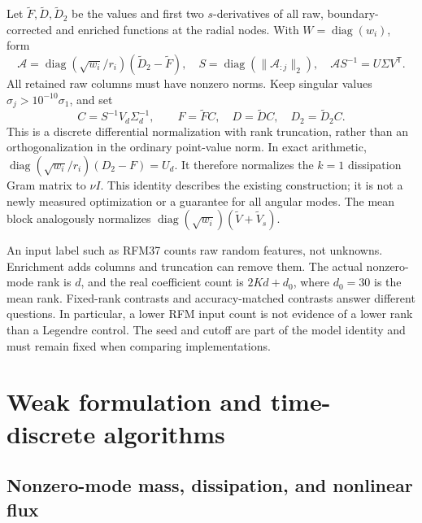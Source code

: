 Let \(\widetilde F,\widetilde D,\widetilde D_2\) be the values and
first two \(s\)-derivatives of all raw, boundary-corrected and enriched
functions at the radial nodes. With \(W=\operatorname{diag}(w_i)\),
form
\begin{equation}
 \mathcal A=\operatorname{diag}(\sqrt{w_i}/r_i)
              (\widetilde D_2-\widetilde F),\quad
 S=\operatorname{diag}(\|\mathcal A_{:j}\|_2),\quad
 \mathcal A S^{-1}=U\Sigma V^{\mathsf T}.
 \label{eq:feature-svd}
\end{equation}
All retained raw columns must have nonzero norms. Keep singular values
\(\sigma_j>10^{-10}\sigma_1\), and set
\begin{equation}
 C=S^{-1}V_d\Sigma_d^{-1},\qquad
 F=\widetilde F C,\quad D=\widetilde D C,\quad
 D_2=\widetilde D_2 C.
 \label{eq:feature-transform}
\end{equation}
This is a discrete differential normalization with rank truncation,
rather than an orthogonalization in the ordinary point-value norm.
In exact arithmetic,
\(\operatorname{diag}(\sqrt{w_i}/r_i)(D_2-F)=U_d\).
It therefore normalizes the \(k=1\) dissipation Gram matrix to
\(\nu I\). This identity describes the existing construction; it is
not a newly measured optimization or a guarantee for all angular modes.
The mean block analogously normalizes
\(\operatorname{diag}(\sqrt{w_i})(\widetilde V+\widetilde V_s)\).

An input label such as RFM37 counts raw random features, not unknowns.
Enrichment adds columns and truncation can remove them. The actual
nonzero-mode rank is \(d\), and the real coefficient count is
\(2Kd+d_0\), where \(d_0=30\) is the mean rank. Fixed-rank contrasts
and accuracy-matched contrasts answer different questions. In
particular, a lower RFM input count is not evidence of a lower rank
than a Legendre control. The seed and cutoff are part of the model
identity and must remain fixed when comparing implementations.



\section{Weak formulation and time-discrete algorithms}
\label{sec:numerical-method}

\subsection{Nonzero-mode mass, dissipation, and nonlinear flux}

